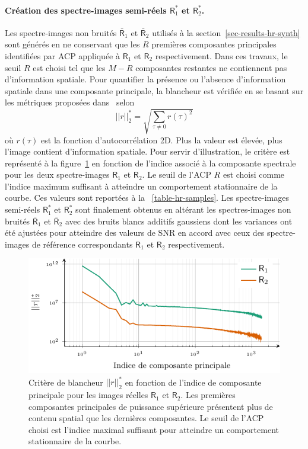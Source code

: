 \paragraph{Création des spectre-images semi-réels $\mathsf{R}_1^*$ et $\mathsf{R}_2^*$.} Les spectre-images non bruités $\bar{\mathsf{R}}_1$ et $\bar{\mathsf{R}}_2$ utilisés à la section~\ref{sec-results-hr-synth} sont générés en ne conservant que les $R$ premières composantes principales identifiées par ACP appliquée à $\mathsf{R}_1$ et $\mathsf{R}_2$ respectivement. Dans ces travaux, le seuil $R$ est choisi tel que les $M-R$ composantes restantes ne contiennent pas d'information spatiale. Pour quantifier la présence ou l'absence d'information spatiale dans une composante principale, la blancheur est vérifiée en se basant sur les métriques proposées dans~\cite[chap. 3]{riot2018residual} selon
\begin{equation}
    ||r||_2^* = \sqrt{\sum_{\tau\neq 0} r(\tau)^2}
\end{equation}
où $r(\tau)$ est la fonction d'autocorrélation 2D. Plus la valeur est élevée, plus l'image contient d'information spatiale. Pour servir d'illustration, le critère est représenté à la figure~\ref{fig-whiteness-metric} en fonction de l'indice associé à la composante spectrale pour les deux spectre-images $\mathsf{R}_1$ et $\mathsf{R}_2$. Le seuil de l'ACP $R$ est choisi comme l'indice maximum suffisant à atteindre un comportement stationnaire de la courbe. Ces valeurs sont reportées à la \tabname~\ref{table-hr-samples}. Les spectre-images semi-réels $\mathsf{R}_1^*$ et $\mathsf{R}_2^*$ sont finalement obtenus en altérant les spectres-images non bruités $\bar{\mathsf{R}}_1$ et $\bar{\mathsf{R}}_2$ avec des bruits blancs additifs gaussiens dont les variances ont été ajustées pour atteindre des valeurs de SNR en accord avec ceux des spectre-images de référence correspondants $\mathsf{R}_1$ et $\mathsf{R}_2$ respectivement.

\begin{figure}[]
    \centering
    \includegraphics{img/chapitre4/figure17/remaining_structure.pdf}
    \caption{Critère de blancheur  $||r||_2^*$ en fonction de l'indice de composante principale pour les images réelles $\mathsf{R}_1$ et $\mathsf{R}_2$. Les premières composantes principales de puissance supérieure présentent plus de contenu spatial que les dernières composantes. Le seuil de l'ACP choisi est l'indice maximal suffisant pour atteindre un comportement stationnaire de la courbe.
        \protect\label{fig-whiteness-metric}}
\end{figure}



